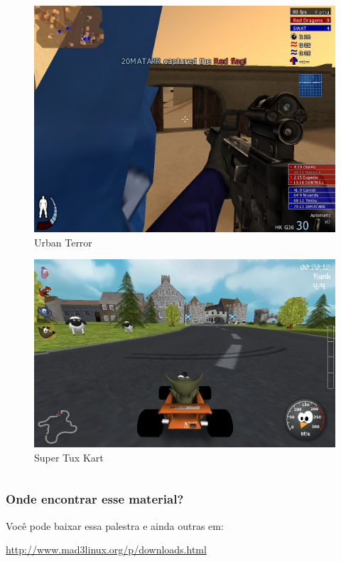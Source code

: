 \begin{frame}
\begin{columns}
	\begin{column}{4cm}
	\begin{figure}
		\includegraphics[scale=0.18]{img/urbanterror.jpg}
		\caption{Urban Terror}
	\end{figure}
	
	\begin{figure}
		\includegraphics[scale=0.18]{img/stk.jpg}
		\caption{Super Tux Kart}
	\end{figure}
	\end{column}
\end{columns}

\end{frame}

\begin{frame}\frametitle{Onde encontrar esse material?}

\begin{center}
Você pode baixar essa palestra e ainda outras em:

\bigskip

\large{\url{http://www.mad3linux.org/p/downloads.html}}
\end{center}

\end{frame}
